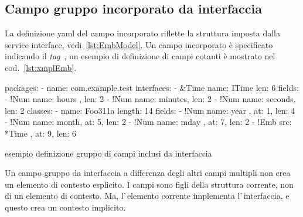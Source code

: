 \documentclass[a4paper,10pt]{report}
\newif\ifesource
\newenvironment{elisting}[1][H]
  {\captionsetup{aboveskip=0pt}\begin{listing}[#1]}
  {\end{listing}%
}
\begin{document}
\subsection{Campo gruppo incorporato da interfaccia} \label{sub:yaml.emb}
La definizione yaml del campo incorporato riflette la struttura imposta dalla
service interface, vedi~\ref{lst:EmbModel}.
Un campo incorporato è specificato indicando il \textsl{tag} 
\,, 
un esempio di definizione di campi cotanti è mostrato nel 
cod.~\ref{lst:xmplEmb}.

\ifesource
\begin{figure*}[!htb]
\begin{lstlisting}[language=yaml, 
caption={esempio definizione di campi inclusi da interfaccia}, 
label=lst:xmplEmp]
packages:
  - name: com.example.test
    interfaces:
      - &Time
        name: ITime
        len: 6
        fields:
          - !Num { name: hours  , len: 2 }
          - !Num { name: minutes, len: 2 }
          - !Num { name: seconds, len: 2 }
    classes:
      - name: Foo311a
        length: 14
        fields:
          - !Num { name: year , at: 1, len: 4 }
          - !Num { name: month, at: 5, len: 2 }
          - !Num { name: mday , at: 7, len: 2 }
          - !Emb { src: *Time , at: 9, len: 6 }
\end{lstlisting}
\end{figure*}
\else
\begin{elisting}[!htb]
\begin{yamlcode}
packages:
  - name: com.example.test
    interfaces:
      - &Time
        name: ITime
        len: 6
        fields:
          - !Num { name: hours  , len: 2 }
          - !Num { name: minutes, len: 2 }
          - !Num { name: seconds, len: 2 }
    classes:
      - name: Foo311a
        length: 14
        fields:
          - !Num { name: year , at: 1, len: 4 }
          - !Num { name: month, at: 5, len: 2 }
          - !Num { name: mday , at: 7, len: 2 }
          - !Emb { src: *Time , at: 9, len: 6 }
\end{yamlcode}
\caption{esempio definizione gruppo di campi inclusi da interfaccia}
\label{lst:xmplEmb}
\end{elisting}
\fi

Un campo gruppo da interfaccia a differenza degli altri campi multipli non 
crea un elemento di contesto esplicito. I campi sono figli della struttura 
corrente, non di un elemento di contesto. Ma, l'\,elemento corrente
implementa l'\,interfaccia, e questo crea un contesto implicito.
\end{document}

